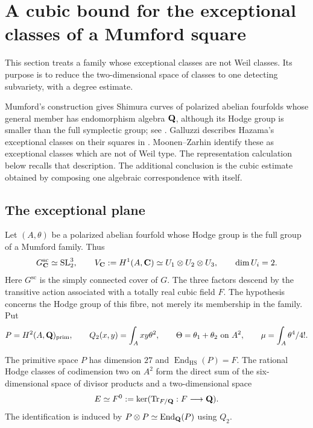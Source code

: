 \section{A cubic bound for the exceptional classes of a Mumford square}
\label{sec:mumford}
This section treats a family whose exceptional classes are not Weil
classes. Its purpose is to reduce the two-dimensional space of classes
to one detecting subvariety, with a degree estimate.

Mumford's construction gives Shimura curves of polarized abelian
fourfolds whose general member has endomorphism algebra $\mathbf Q$, although
its Hodge group is smaller than the full symplectic group; see
\cite[\S1.1]{Noot}. Galluzzi describes Hazama's exceptional classes on
their squares in \cite[Introduction, p.~727;
Propositions~4.1--4.2, pp.~733--734]{Galluzzi}.
Moonen--Zarhin \cite[Theorem~0.1(iii), p.~2]{MoonenZarhin}
identify these as exceptional classes which are not of Weil type.
The representation calculation below recalls that description. The
additional conclusion is the cubic estimate obtained by composing one
algebraic correspondence with itself.

\subsection{The exceptional plane}

Let $(A,\theta)$ be a polarized abelian fourfold whose Hodge group is the
full group of a Mumford family. Thus
\[
 G^{\mathrm{sc}}_{\mathbf C}\simeq\mathrm{SL}_2^3,\qquad
 V_{\mathbf C}:=H^1(A,\mathbf C)\simeq U_1\otimes U_2\otimes U_3,
 \qquad \dim U_i=2.
\]
Here $G^{\mathrm{sc}}$ is the simply connected cover of $G$.
The three factors descend by the transitive action associated with a
totally real cubic field $F$. The hypothesis concerns the Hodge group
of this fibre, not merely its membership in the family. Put
\[
 P=H^2(A,\mathbf Q)_{\mathrm{prim}},\qquad
 Q_2(x,y)=\int_Axy\theta^2,\qquad
 \Theta=\theta_1+\theta_2\text{ on }A^2,\qquad
 \mu=\int_A\theta^4/4!.
\]

\begin{lemma}\label{lem:mumford-plane}
The primitive space $P$ has dimension $27$ and
$\operatorname{End}_{\mathrm{HS}}(P)=F$. The rational Hodge classes
of codimension two on $A^2$ form the direct sum of the six-dimensional
space of divisor products and a two-dimensional space
\[
 E\simeq F^0:=\ker(\operatorname{Tr}_{F/\mathbf Q}:F\longrightarrow\mathbf Q).
\]
The identification is induced by
$P\otimes P\simeq\operatorname{End}_{\mathbf Q}(P)$ using $Q_2$.
\end{lemma}

